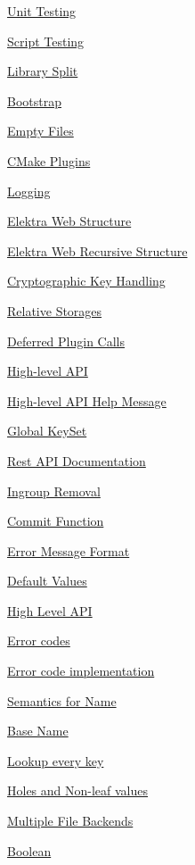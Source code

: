 \begin{DoxyItemize}
\item \hyperlink{doc_decisions_unit_testing_md}{Unit Testing}
\item \hyperlink{doc_decisions_script_testing_md}{Script Testing}
\item \hyperlink{doc_decisions_library_split_md}{Library Split}
\item \hyperlink{doc_decisions_bootstrap_md}{Bootstrap}
\item \hyperlink{doc_decisions_empty_files_md}{Empty Files}
\item \hyperlink{doc_decisions_cmake_plugins_md}{C\+Make Plugins}
\item \hyperlink{doc_decisions_logging_md}{Logging}
\item \hyperlink{doc_decisions_elektra_web_md}{Elektra Web Structure}
\item \hyperlink{doc_decisions_elektra_web_recursive_md}{Elektra Web Recursive Structure}
\item \hyperlink{doc_decisions_cryptograhic_key_handling_md}{Cryptographic Key Handling}
\item \hyperlink{doc_decisions_relative_md}{Relative Storages}
\item \hyperlink{doc_decisions_deferred_plugin_calls_md}{Deferred Plugin Calls}
\item \hyperlink{doc_decisions_high_level_api_md}{High-\/level A\+PI}
\item \hyperlink{doc_decisions_highlevel_help_message_md}{High-\/level A\+PI Help Message}
\item \hyperlink{doc_decisions_global_keyset_md}{Global Key\+Set}
\item \hyperlink{doc_decisions_rest_api_documentation_md}{Rest A\+PI Documentation}
\item \hyperlink{doc_decisions_ingroup_removal_md}{Ingroup Removal}
\item \hyperlink{doc_decisions_commit_function_md}{Commit Function}
\item \hyperlink{doc_decisions_error_message_format_md}{Error Message Format}
\item \hyperlink{doc_decisions_default_values_md}{Default Values}
\item \hyperlink{doc_decisions_high_level_api_md}{High Level A\+PI}
\item \hyperlink{doc_decisions_error_codes_md}{Error codes}
\item \hyperlink{doc_decisions_error_code_implementation_md}{Error code implementation}
\item \hyperlink{doc_decisions_semantics_name_md}{Semantics for Name}
\item \hyperlink{doc_decisions_base_name_md}{Base Name}
\item \hyperlink{doc_decisions_lookup_every_key_md}{Lookup every key}
\item \hyperlink{doc_decisions_holes_md}{Holes and Non-\/leaf values}
\item \hyperlink{doc_decisions_multiple_file_backends_md}{Multiple File Backends}
\item \hyperlink{doc_decisions_boolean_md}{Boolean}
\end{DoxyItemize}


